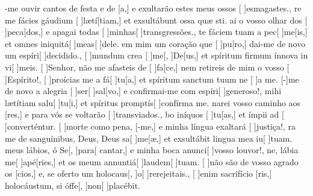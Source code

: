 {    {-me ouvir cantos de festa e de [a,] e exultarão estes meus ossos [ ]{es}{ma}{gas}tes.},
  {re me fácies gáudium [ ]{læ}{tí}[tiam,] et exsultábunt ossa quæ sti.}%
    {ai o vosso olhar dos [ ]{pe}{ca}[dos,] e apagai todas [ ]{mi}{nhas}[ ]{transgres}sões.},
  {te fáciem tuam a pec[ ]{me}[is,] et omnes iniquitá[ ]{me}{as}[ ]{de}le.}%
    { em mim um coração que [ ]{pu}[ro,] dai-me de novo um espíri[ ]{de}{ci}{di}do.},
  {[ ]{mun}dum crea [ ]{me}[, ]{De}[us,] et spíritum firmum ínnova in vi[ ]{me}is.}%
    {[ ]{Se}nhor, não me afasteis de [ ]{fa}[ce,] nem retireis de mim o vosso [ ]{Es}{píri}to!},
  {[ ]{pro}ícias me a fá[ ]{tu}[a,] et spíritum sanctum tuum ne [ ]{a} me.}%
    {[-]{me} de novo a alegria [ ]{ser}[ ]{sal}[vo,] e confir\-mai-me com espíri[ ]{ge}{ne}{ro}so!},
  { mihi lætítiam salu[ ]{tu}[i,] et spíritus promptís[ ]{con}{fírma} me.}%
    {narei vosso caminho aos [res,] e para vós se voltarão [ ]{trans}{vi}{a}dos.},
  {bo iníquos [ ]{tu}[as,] et ímpii ad [ ]{con}{ver}{tén}{\-tur.}}%
    {[ ]{mor}te como pena, [-me,] e minha língua exaltará [ ]{jus}{ti}ça!},
  {ra me de sanguínibus, Deus, Deus sa[ ]{me}[\-æ,] et exsultábit lingua mea iu[ ]{tu}am.}%
    { meus lábios, ó Se[, ]{pa}{ra}[ cantar,] e minha boca anunci[ ]{vos}{so lou}vor!},
  {ne, lábia me[ ]{a}{pé}[ries,] et os meum annuntiá[ ]{lau}{dem}[ ]{tu}am.}%
    {[ ]{não} são de vosso agrado os [cios,] e, se oferto um holocaus[, ]{o}[ ]{re}{rejei}tais.},
  {[ ]{e}nim sacrifício [ris,] holocáustum, si óffe[, ]{non}[ ]{pla}{cé}bit.}%
}
